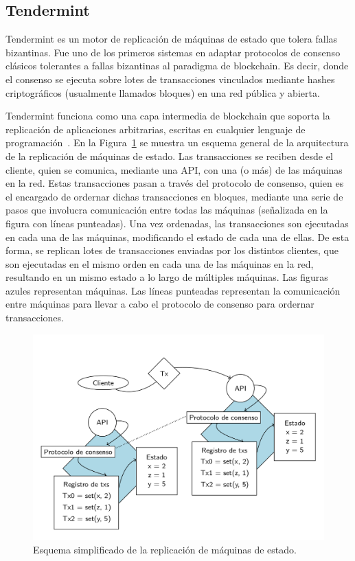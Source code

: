 \subsection{Tendermint}\label{sec:tendermint}
Tendermint es un motor de replicación de máquinas de estado que tolera fallas bizantinas.
%
Fue uno de los primeros sistemas en adaptar protocolos de consenso clásicos tolerantes a fallas bizantinas
al paradigma de blockchain.
%
Es decir, donde el consenso se ejecuta sobre lotes de transacciones vinculados mediante
hashes criptográficos (usualmente llamados bloques) en una red pública y abierta.

%

Tendermint funciona como una capa intermedia de blockchain que soporta la replicación de aplicaciones arbitrarias,
escritas en cualquier lenguaje de programación~\cite{tendermint.design}.
%
En la Figura~\ref{fig:replication} se muestra un esquema general de la arquitectura de la replicación de máquinas de
estado.
%
Las transacciones se reciben desde el cliente, quien se comunica, mediante una API, con una (o más) de las máquinas
en la red.
%
Estas transacciones pasan a través del protocolo de consenso, quien es el encargado de ordernar dichas
transacciones en bloques, mediante una serie de pasos que involucra comunicación entre todas las máquinas
(señalizada en la figura con líneas punteadas).
%
Una vez ordenadas, las transacciones son ejecutadas en cada una de las máquinas, modificando el estado
de cada una de ellas.
%
De esta forma, se replican lotes de transacciones enviadas por los distintos clientes, que son ejecutadas en el mismo
orden en cada una de las máquinas en la red, resultando en un mismo estado a lo largo de múltiples máquinas.
%
Las figuras azules representan máquinas.
%
Las líneas punteadas representan la comunicación entre máquinas para llevar a cabo el protocolo de consenso para ordernar
transacciones.

\begin{figure}
  \centering
  \includegraphics[scale=0.3]{figures/state-machine-replication.png}
  \caption{Esquema simplificado de la replicación de máquinas de estado.}
  \label{fig:replication}
\end{figure}

